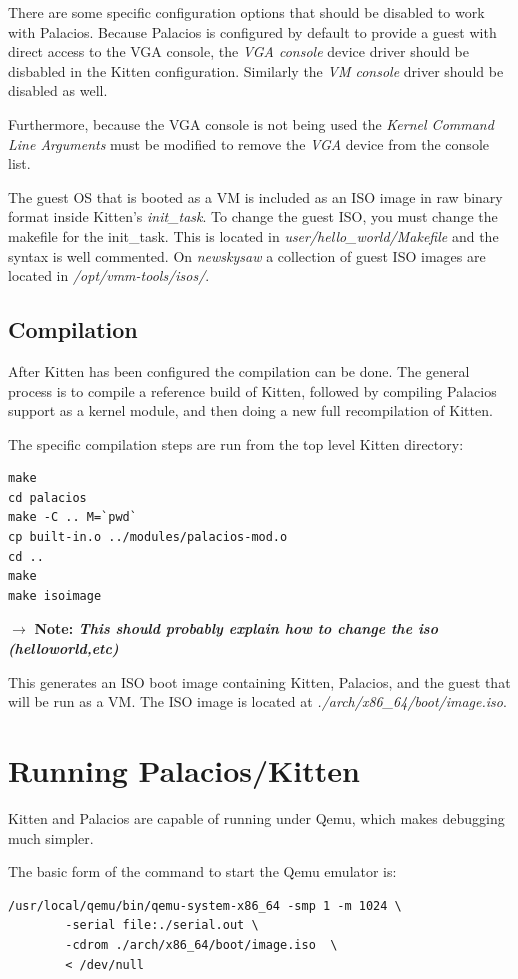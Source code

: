 \documentclass[11pt]{article}
\newcommand{\note}[1]{{$\rightarrow$ \bf Note: \emph{#1}}}
\begin{document}
There are some specific configuration options that should be disabled
to work with Palacios. Because Palacios is configured by default to
provide a guest with direct access to the VGA console, the {\em VGA
console} device driver should be disbabled in the Kitten
configuration. Similarly the {\em VM console} driver should be
disabled as well.

Furthermore, because the VGA console is not being used the {\em Kernel
Command Line Arguments} must be modified to remove the {\em VGA}
device from the console list.

The guest OS that is booted as a VM is included as an ISO image in raw
binary format inside Kitten's {\em init\_task}. To change the guest
ISO, you must change the makefile for the init\_task. This is located
in {\em user/hello\_world/Makefile} and the syntax is well commented.
On {\em newskysaw} a collection of guest ISO images are located in
{\em /opt/vmm-tools/isos/}. 


\subsection{Compilation}
After Kitten has been configured the compilation can be done. The
general process is to compile a reference build of Kitten, followed by
compiling Palacios support as a kernel module, and then doing a new
full recompilation of Kitten.

The specific compilation steps are run from the top level Kitten directory:
\begin{verbatim}
make
cd palacios
make -C .. M=`pwd`
cp built-in.o ../modules/palacios-mod.o
cd ..
make
make isoimage
\end{verbatim}

\note{This should probably explain how to change the iso (helloworld,etc)}

This generates an ISO boot image containing Kitten, Palacios, and the
guest that will be run as a VM. The ISO image is located at {\em
./arch/x86\_64/boot/image.iso}.


\section{Running Palacios/Kitten}
Kitten and Palacios are capable of running under Qemu, which makes
debugging much simpler.

The basic form of the command to start the Qemu emulator is:
\begin{verbatim}
/usr/local/qemu/bin/qemu-system-x86_64 -smp 1 -m 1024 \
        -serial file:./serial.out \
        -cdrom ./arch/x86_64/boot/image.iso  \
        < /dev/null
\end{verbatim}
\end{document}

